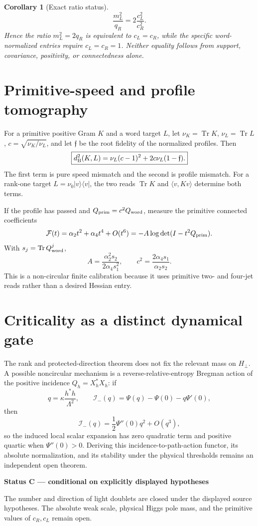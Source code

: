\documentclass[11pt,oneside,openany]{book}
\numberwithin{equation}{chapter}
\newtheorem{corollary}[theorem]{Corollary}
\theoremstyle{definition}
\theoremstyle{remark}
\newcommand{\Tr}{\operatorname{Tr}}
\newenvironment{statusbox}[2]{%
  \par\medskip\noindent
  \begin{center}\begin{minipage}{0.94\textwidth}
  \colorbox{#1!8}{\parbox{\dimexpr\linewidth-2\fboxsep\relax}{\textbf{#2}}}\par\smallskip
}{%
  \end{minipage}\end{center}\medskip
}
\newcommand{\Conditional}[1]{\begin{statusbox}{CondColor}{Status C --- conditional on explicitly displayed hypotheses}#1\end{statusbox}}
\begin{document}
\begin{corollary}[Exact ratio status]
\[
 \frac{m_L^2}{q_R}=2\frac{c_L^2}{c_R^2}.
\]
Hence the ratio \(m_L^2=2q_R\) is equivalent to \(c_L=c_R\), while the
specific word-normalized entries require \(c_L=c_R=1\).  Neither equality
follows from support, covariance, positivity, or connectedness alone.
\end{corollary}

\section{Primitive-speed and profile tomography}
For a primitive positive Gram \(K\) and a word target \(L\), let
\(\nu_K=\Tr K\), \(\nu_L=\Tr L\),
\(c=\sqrt{\nu_K/\nu_L}\), and let \(\mathfrak f\) be the root fidelity of
the normalized profiles.  Then
\[
 \boxed{
 d_{\rm B}^2(K,L)
 =\nu_L(c-1)^2+2c\nu_L(1-\mathfrak f).}
\]
The first term is pure speed mismatch and the second is profile mismatch.
For a rank-one target \(L=\nu_0|v\rangle\langle v|\), the two reads
\(\Tr K\) and \(\langle v,Kv\rangle\) determine both terms.

If the profile has passed and \(Q_{\rm prim}=c^2Q_{\rm word}\), measure the
primitive connected coefficients
\[
 \mathcal F(t)=\alpha_2t^2+\alpha_4t^4+O(t^6)
 =-A\log\det(I-t^2Q_{\rm prim}).
\]
With \(s_j=\Tr Q_{\rm word}^j\),
\[
 \boxed{
 A=\frac{\alpha_2^2s_2}{2\alpha_4s_1^2},
 \qquad
 c^2=\frac{2\alpha_4s_1}{\alpha_2s_2}.}
\]
This is a non-circular finite calibration because it uses primitive two- and
four-jet reads rather than a desired Hessian entry.

\section{Criticality as a distinct dynamical gate}
The rank and protected-direction theorem does not fix the relevant mass on
\(H_\perp\).  A possible noncircular mechanism is a reverse-relative-entropy
Bregman action of the positive incidence \(Q_h=X_h^*X_h\): if
\[
 q=\kappa\frac{h^*h}{\Lambda^2},
 \qquad
 \mathcal I_-(q)=\Psi(q)-\Psi(0)-q\Psi'(0),
\]
then
\[
 \mathcal I_-(q)=\frac12\Psi''(0)q^2+O(q^3),
\]
so the induced local scalar expansion has zero quadratic term and positive
quartic when \(\Psi''(0)>0\).  Deriving this incidence-to-path-action functor,
its absolute normalization, and its stability under the physical thresholds
remains an independent open theorem.

\Conditional{The number and direction of light doublets are closed under the
displayed source hypotheses.  The absolute weak scale, physical Higgs pole
mass, and the primitive values of \(c_R,c_L\) remain open.}
\end{document}
